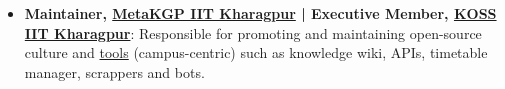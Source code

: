 \documentclass[a4paper,10pt]{extarticle} %
\begin{document}
\begin{itemize}[leftmargin=0.55cm, rightmargin=0.2cm, label={\Large\textbullet}]


\item \textbf{Maintainer, \href{https://wiki.metakgp.org/w/Metakgp:About}{MetaKGP IIT Kharagpur} | Executive Member, \href{https://kossiitkgp.org/about/index.html}{KOSS IIT Kharagpur}}: Responsible for promoting and maintaining open-source culture and \href{https://github.com/metakgp/}{tools} (campus-centric) such as knowledge wiki, APIs, timetable manager, scrappers and bots.
\end{itemize}






\end{document}
